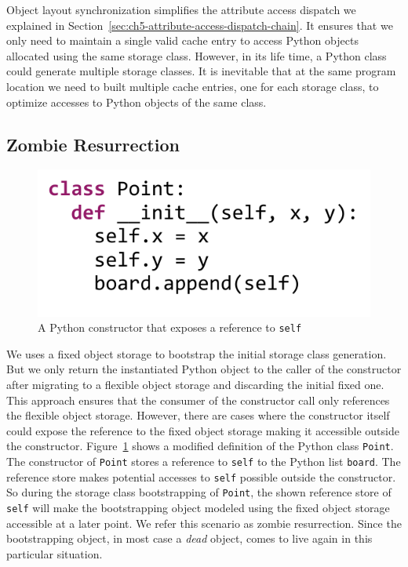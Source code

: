 Object layout synchronization simplifies the attribute access dispatch we explained in Section~\ref{sec:ch5-attribute-access-dispatch-chain}.
It ensures that we only need to maintain a single valid cache entry to access Python objects allocated using the same storage class.
However, in its life time, a Python class could generate multiple storage classes.
It is inevitable that at the same program location we need to built multiple cache entries, one for each storage class, to optimize accesses to Python objects of the same class.

\subsection{Zombie Resurrection}
\label{sec:ch5-zombie-resurrection}

\begin{figure}
\centering
\includegraphics[scale=.7]{figures/ch5-python-class-point-with-zombie-store-code}
\caption{A Python constructor that exposes a reference to \texttt{self}}
\label{fig:ch5-python-class-point-with-zombie-store-code}
\end{figure}

We uses a fixed object storage to bootstrap the initial storage class generation.
But we only return the instantiated Python object to the caller of the constructor after migrating to a flexible object storage and discarding the initial fixed one.
This approach ensures that the consumer of the constructor call only references the flexible object storage.
However, there are cases where the constructor itself could expose the reference to the fixed object storage making it accessible outside the constructor.
Figure~\ref{fig:ch5-python-class-point-with-zombie-store-code} shows a modified definition of the Python class \texttt{Point}.
The constructor of \texttt{Point} stores a reference to \texttt{self} to the Python list \texttt{board}.
The reference store makes potential accesses to \texttt{self} possible outside the constructor.
So during the storage class bootstrapping of \texttt{Point}, the shown reference store of \texttt{self} will make the bootstrapping object modeled using the fixed object storage accessible at a later point.
We refer this scenario as zombie resurrection.
Since the bootstrapping object, in most case a \emph{dead} object, comes to live again in this particular situation.

